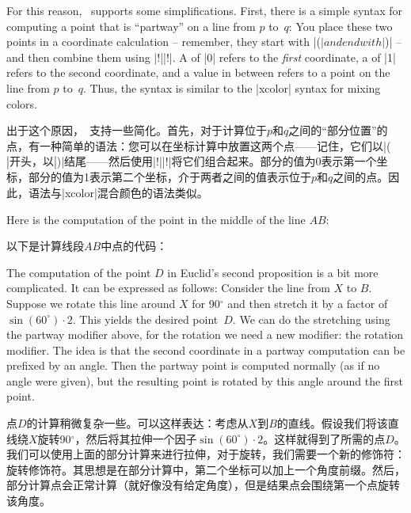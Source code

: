 \begin{paracol}{2}
For this reason, \tikzname\ supports some simplifications. First, there is a
simple syntax for computing a point that is ``partway'' on a line from $p$
to~$q$: You place these two points in a coordinate calculation -- remember,
they start with |($| and end with |$)| -- and then combine them using
|!||!|. A  of |0| refers to the \emph{first} coordinate,
a  of |1| refers to the second coordinate, and a value in between
refers to a point on the line from $p$ to~$q$. Thus, the syntax is similar to
the |xcolor| syntax for mixing colors.

出于这个原因，\tikzname\ 支持一些简化。首先，对于计算位于$p$和$q$之间的“部分位置”的点，有一种简单的语法：您可以在坐标计算中放置这两个点——记住，它们以|($|开头，以|$)|结尾——然后使用|!||!|将它们组合起来。部分的值为0表示第一个坐标，部分的值为1表示第二个坐标，介于两者之间的值表示位于$p$和$q$之间的点。因此，语法与|xcolor|混合颜色的语法类似。


Here is the computation of the point in the middle of the line $AB$:

以下是计算线段$AB$中点的代码：
%
\begin{codeexample}[preamble={\usetikzlibrary{calc}}]
\end{codeexample}

The computation of the point $D$ in Euclid's second proposition is a bit more
complicated. It can be expressed as follows: Consider the line from $X$ to $B$.
Suppose we rotate this line around $X$ for 90$^\circ$ and then stretch it by a
factor of $\sin(60^\circ) \cdot 2$. This yields the desired point~$D$. We can
do the stretching using the partway modifier above, for the rotation we need a
new modifier: the rotation modifier. The idea is that the second coordinate in
a partway computation can be prefixed by an angle. Then the partway point is
computed normally (as if no angle were given), but the resulting point is
rotated by this angle around the first point.
%

点$D$的计算稍微复杂一些。可以这样表达：考虑从$X$到$B$的直线。假设我们将该直线绕$X$旋转90$^\circ$，然后将其拉伸一个因子$\sin(60^\circ) \cdot 2$。这样就得到了所需的点$D$。我们可以使用上面的部分计算来进行拉伸，对于旋转，我们需要一个新的修饰符：旋转修饰符。其思想是在部分计算中，第二个坐标可以加上一个角度前缀。然后，部分计算点会正常计算（就好像没有给定角度），但是结果点会围绕第一个点旋转该角度。


\end{paracol}
